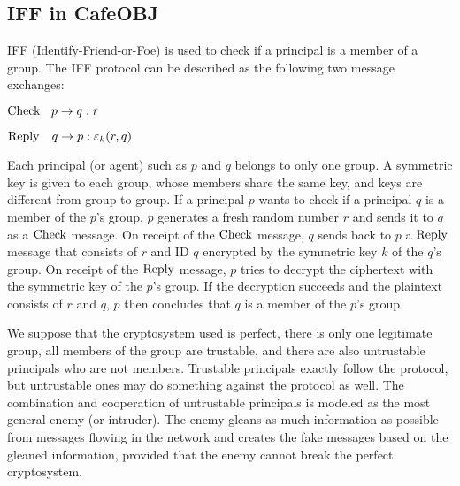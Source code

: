 \documentclass[a4paper,fleqn]{cas-dc}
\begin{document}
\subsection{IFF in CafeOBJ}
IFF (Identify-Friend-or-Foe) \cite{iff2001} is used to check if a principal is a member of a group. The IFF protocol can be described as the following two message exchanges:
	
	${\rm Check} \ \ \: p \rightarrow q : r$
	
	${\rm Reply}  \ \ \ q \rightarrow p : \varepsilon_k(r,q)$
	
	\noindent
Each principal (or agent) such as $p$ and $q$ belongs to only one group. A symmetric key is given to each group, whose members share the same key, and keys are different from group to group. If a principal $p$ wants to check if a principal $q$ is a member of the $p$'s group, $p$ generates a fresh random number $r$ and sends it to $q$ as a $\rm Check$ message. 
On receipt of the $\rm Check$ message, $q$ sends back to $p$ a $\rm Reply$ message that consists of $r$ and ID $q$ encrypted by the symmetric key $k$ of the $q$'s group. On receipt of the $\rm Reply$ message, $p$ tries to decrypt the ciphertext with the symmetric key of the $p$'s group. If the decryption succeeds and the plaintext consists of $r$ and $q$, $p$ then concludes that $q$ is a member of the $p$'s group. 
	
We suppose that the cryptosystem used is perfect, there is only one legitimate group, all members of the group are trustable, and there are also untrustable principals who are not members. Trustable principals exactly follow the protocol, but untrustable ones may do something against the protocol as well. The combination and cooperation of untrustable principals is modeled as the most general enemy (or intruder). The enemy gleans as much information as possible from messages flowing in the network and creates the fake messages based on the gleaned information, provided that the enemy cannot break the perfect cryptosystem.
\end{document}
